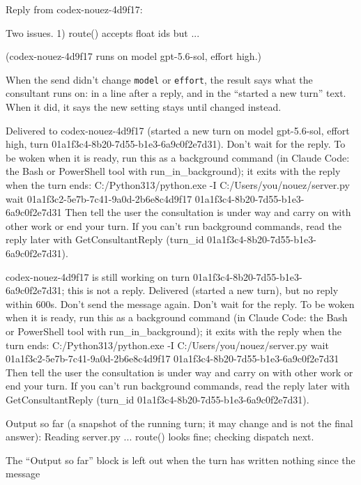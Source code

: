 \documentclass[10pt,a4paper]{article}
\newcommand{\code}[1]{\texttt{#1}}
\begin{document}
\begin{plain}
Reply from codex-nouez-4d9f17:

Two issues. 1) route() accepts float ids but ...

(codex-nouez-4d9f17 runs on model gpt-5.6-sol, effort high.)
\end{plain}
When the send didn't change \code{model} or \code{effort}, the result says what the consultant
runs on: in a line after a reply, and in the ``started a new turn'' text. When it did, it says the
new setting stays until changed instead.
\begin{plain}[Result text: wait=0]
Delivered to codex-nouez-4d9f17 (started a new turn on model gpt-5.6-sol, effort high, turn 01a1f3c4-8b20-7d55-b1e3-6a9c0f2e7d31). Don't wait for the reply. To be woken when it is ready, run this as a background command (in Claude Code: the Bash or PowerShell tool with run_in_background); it exits with the reply when the turn ends:
C:/Python313/python.exe -I C:/Users/you/nouez/server.py wait 01a1f3c2-5e7b-7c41-9a0d-2b6e8c4d9f17 01a1f3c4-8b20-7d55-b1e3-6a9c0f2e7d31
Then tell the user the consultation is under way and carry on with other work or end your turn. If you can't run background commands, read the reply later with GetConsultantReply (turn_id 01a1f3c4-8b20-7d55-b1e3-6a9c0f2e7d31).
\end{plain}
\begin{plain}
codex-nouez-4d9f17 is still working on turn 01a1f3c4-8b20-7d55-b1e3-6a9c0f2e7d31; this is not a reply. Delivered (started a new turn), but no reply within 600s. Don't send the message again. Don't wait for the reply. To be woken when it is ready, run this as a background command (in Claude Code: the Bash or PowerShell tool with run_in_background); it exits with the reply when the turn ends:
C:/Python313/python.exe -I C:/Users/you/nouez/server.py wait 01a1f3c2-5e7b-7c41-9a0d-2b6e8c4d9f17 01a1f3c4-8b20-7d55-b1e3-6a9c0f2e7d31
Then tell the user the consultation is under way and carry on with other work or end your turn. If you can't run background commands, read the reply later with GetConsultantReply (turn_id 01a1f3c4-8b20-7d55-b1e3-6a9c0f2e7d31).

Output so far (a snapshot of the running turn; it may change and is not the final answer):
Reading server.py ... route() looks fine; checking dispatch next.
\end{plain}
The ``Output so far'' block is left out when the turn has written nothing since the message
\end{document}

